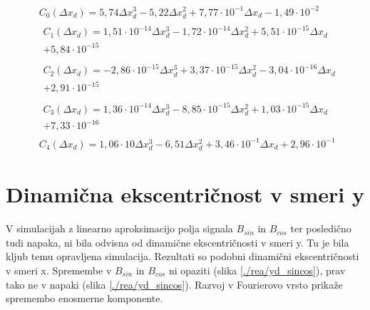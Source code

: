 \begin{eqnarray}
&C_0(\Delta x_d) =5,74\Delta x_d^{3}-5,22\Delta x_d^{2}+7,77\cdot 10^{-1}\Delta x_d-1,49\cdot 10^{-2} \\                               
&\begin{split}C_1(\Delta x_d) =1,51\cdot 10^{-14}\Delta x_d^{3}-1,72\cdot 10^{-14}\Delta x_d^{2}+5,51\cdot 10^{-15}\Delta x_d\\+5,84\cdot 10^{-15}\end{split} \\ 
&\begin{split}C_2(\Delta x_d) =-2,86\cdot 10^{-15}\Delta x_d^{3}+3,37\cdot 10^{-15}\Delta x_d^{2}-3,04\cdot 10^{-16}\Delta x_d\\+2,91\cdot 10^{-15}\end{split} \\
&\begin{split}C_3(\Delta x_d) =1,36\cdot 10^{-14}\Delta x_d^{3}-8,85\cdot 10^{-15}\Delta x_d^{2}+1,03\cdot 10^{-15}\Delta x_d\\+7,33\cdot 10^{-16}\end{split} \\ 
&C_4(\Delta x_d) =1,06\cdot 10\Delta x_d^{3}-6,51\Delta x_d^{2}+3,46\cdot 10^{-1}\Delta x_d+2,96\cdot 10^{-1}
\end{eqnarray}
\section{Dinamična ekscentričnost v smeri y}
V simulacijah z linearno aproksimacijo polja signala $B_{sin}$ in $B_{cos}$ ter posledično tudi napaka, ni bila odvisna od dinamične ekscentričnosti v smeri y. Tu je bila kljub temu opravljena simulacija. Rezultati so podobni dinamični ekscentričnosti v smeri x. Spremembe v $B_{sin}$ in $B_{cos}$ ni opaziti (slika \ref{./rea/yd_sincos}), prav tako ne v napaki (slika \ref{./rea/yd_sincos}). Razvoj v Fourierovo vrsto prikaže spremembo enosmerne komponente.
\newpage
